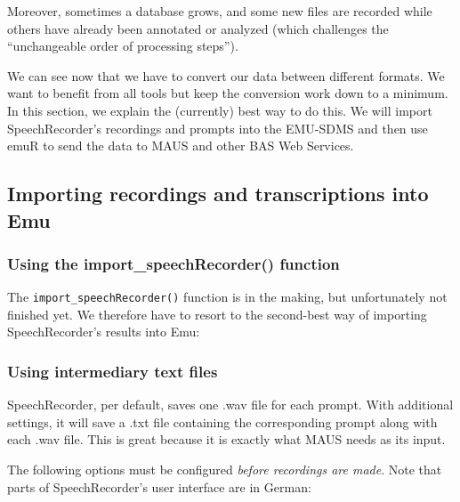 \documentclass[]{book}
\theoremstyle{definition}
\theoremstyle{definition}
\theoremstyle{definition}
\theoremstyle{remark}
\begin{document}
Moreover, sometimes a database grows, and some new files are recorded
while others have already been annotated or analyzed (which challenges
the ``unchangeable order of processing steps'').

We can see now that we have to convert our data between different
formats. We want to benefit from all tools but keep the conversion work
down to a minimum. In this section, we explain the (currently) best way
to do this. We will import SpeechRecorder's recordings and prompts into
the EMU-SDMS and then use emuR to send the data to MAUS and other BAS
Web Services.

\subsection{Importing recordings and transcriptions into
Emu}\label{importing-recordings-and-transcriptions-into-emu}

\subsubsection{Using the import\_speechRecorder()
function}\label{using-the-import_speechrecorder-function}

The \texttt{import\_speechRecorder()} function is in the making, but
unfortunately not finished yet. We therefore have to resort to the
second-best way of importing SpeechRecorder's results into Emu:

\subsubsection{Using intermediary text
files}\label{using-intermediary-text-files}

SpeechRecorder, per default, saves one .wav file for each prompt. With
additional settings, it will save a .txt file containing the
corresponding prompt along with each .wav file. This is great because it
is exactly what MAUS needs as its input.

The following options must be configured \emph{before recordings are
made}. Note that parts of SpeechRecorder's user interface are in German:
\end{document}

